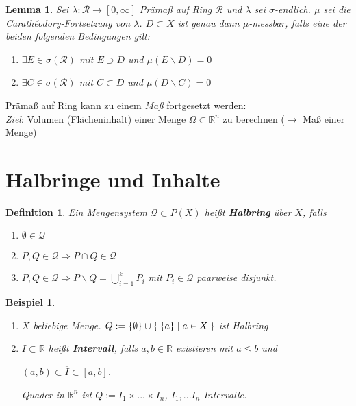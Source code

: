\documentclass[11pt]{memoir}
\theoremstyle{changebreak}
\newtheorem{Definition}{Definition}[chapter]
\newtheorem{Beispiel}{Beispiel}[chapter]
\newtheorem{Lemma}{Lemma}[chapter]
\newcommand{\cara}{Carathéodory-Fortsetzung}
\begin{document}
\begin{Lemma}
Sei $\lambda: \mathscr R \rightarrow [0, \infty]$ Prämaß auf Ring $\mathscr R$ und $\lambda$ sei $\sigma$-endlich. $\mu$ sei die \cara\; von $\lambda$. $D \subset X$ ist genau dann $\mu$-messbar, falls eine der beiden folgenden Bedingungen gilt:
\begin{enumerate}
	\item $\exists E \in \sigma(\mathscr R)$ mit $E \supset D$ und $\mu(E \backslash D) = 0$
	\item $\exists C \in \sigma(\mathscr R)$ mit $C \subset D$ und $\mu(D \backslash C) = 0$
\end{enumerate}
\end{Lemma}

Prämaß auf Ring kann zu einem \emph{Maß} fortgesetzt werden: \\
\emph{Ziel}: Volumen (Flächeninhalt) einer Menge $\Omega \subset \mathbb R^n$ zu berechnen ($\rightarrow$ Maß einer Menge)


\section{Halbringe und Inhalte}
\begin{Definition}
Ein Mengensystem $\mathscr Q \subset P(X)$ heißt \textbf{Halbring} über $X$, falls
\begin{enumerate}
	\item $\emptyset \in \mathscr Q$
	\item $P, Q \in \mathscr Q \Rightarrow P \cap Q \in \mathscr Q$
	\item $P, Q \in \mathscr Q \Rightarrow P \backslash Q = \bigcup\limits_{i=1}^k P_i$ mit $P_i \in \mathscr Q$ paarweise disjunkt.
\end{enumerate}
\end{Definition}

\begin{Beispiel}
\begin{enumerate}
	\item $X$ beliebige Menge. $Q := \{\emptyset\} \cup \Set{\{a\}|  a \in X}$ ist Halbring
	\item $I \subset \mathbb R$ heißt \textbf{Intervall}, falls $a, b \in \mathbb R$ existieren mit $a \leq b$ und 
	\begin{center}
		$(a, b) \subset \overline{I} \subset [a, b]$. 
	\end{center}
	Quader in $\mathbb R^n$ ist $ Q:= I_1 \times ... \times I_n$,  \quad $I_1, ... I_n$ Intervalle.
\end{enumerate}
\end{Beispiel}
\end{document}

